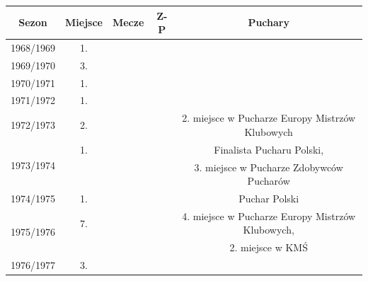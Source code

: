 \documentclass{article}
\begin{document}
\label{tabela1}
\begin{tabular}{|c|c|c|c|c|} \hline
Sezon &	Miejsce & Mecze & Z-P & Puchary \\ \hline
 
1968/1969	&1.	& & & 	\\	\hline

1969/1970	&3.& & &\\		\hline	
1970/1971	&1. & & &\\		\hline	
1971/1972	&1. & & &\\\hline
	
1972/1973	&2.	&	&	&2. miejsce w Pucharze Europy Mistrzów Klubowych\\\hline
\multirow{2}{*}{1973/1974}	&1.	&	&	&Finalista Pucharu Polski,\\
							&	&	&	&3. miejsce w Pucharze Zdobywców Pucharów\\\hline
1974/1975	&1.	&	&	&Puchar Polski\\\hline
\multirow{2}{*}{1975/1976}	&7.	&	&	&4. miejsce w Pucharze Europy Mistrzów Klubowych,\\
						    &	&	&	&2. miejsce w KMŚ\\\hline
1976/1977	&3.	 & & &\\		\hline


\end{tabular}
\end{document}
